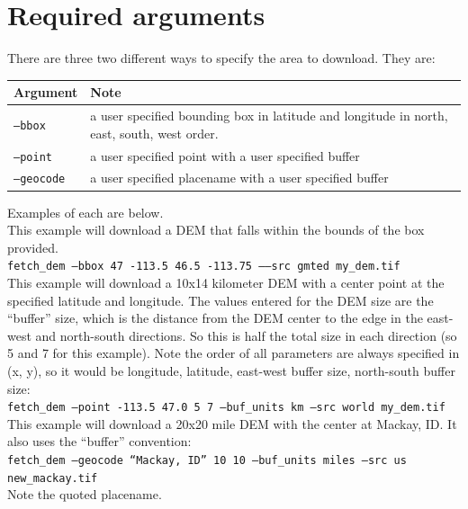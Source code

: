\documentclass[12pt,oneside,final]{article}
\begin{document}
\section{Required arguments}
There are three two different ways to specify the area to download.  They are:
\medskip
\begin{center}
\begin{tabular}{| l | p{4.0in} |}
    \hline
    Argument & Note \\ \hline
    \texttt{--bbox} & a user specified bounding box in latitude and longitude
                       in north, east, south, west order.\\ \hline
    \texttt{--point} & a user specified point with a user specified buffer \\
                       \hline
    \texttt{--geocode} & a user specified placename with a user specified
                         buffer \\ \hline
\end{tabular}
\end{center}
Examples of each are below.\\

\noindent
This example will download a DEM that falls within the bounds of the box
provided.\\
\texttt{fetch\_dem --bbox 47 -113.5 46.5 -113.75 --–src gmted my\_dem.tif}\\

\noindent
This example will download a 10x14 kilometer DEM with a center point at the
specified latitude and longitude.  The values entered for the DEM size are the 
``buffer'' size, which is the distance from the DEM center to the edge in the
east-west and north-south directions.  So this is half the total size in each
direction (so 5 and 7 for this example).  Note the order of all parameters are
always specified in (x, y), so it would be longitude, latitude, east-west buffer
size, north-south buffer size:\\
\texttt{fetch\_dem --point -113.5 47.0 5 7 --buf\_units km --src world my\_dem.tif}\\

\noindent
This example will download a 20x20 mile DEM with the center at Mackay, ID. It also
uses the ``buffer'' convention:\\
\texttt{fetch\_dem --geocode ``Mackay, ID'' 10 10 --buf\_units miles --src us
new\_mackay.tif}\\
Note the quoted placename.\\
\end{document}
